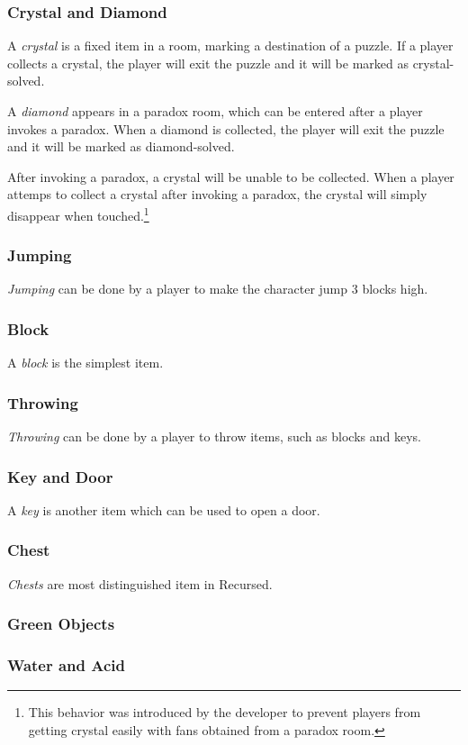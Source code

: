 \documentclass[a4paper]{article}
\theoremstyle{definition}
\begin{document}
\subsubsection{Crystal and Diamond}
A \emph{crystal} is a fixed item in a room, marking a destination of a puzzle. If a player
collects a crystal, the player will exit the puzzle and it will be marked as crystal-solved.

A \emph{diamond} appears in a paradox room, which can be entered after a player invokes a paradox.
When a diamond is collected, the player will exit the puzzle and it will be marked as diamond-solved.

After invoking a paradox, a crystal will be unable to be collected. When a player attemps to collect a crystal
after invoking a paradox, the crystal will simply disappear when touched.\footnote{This behavior was introduced
by the developer to prevent players from getting crystal easily with fans obtained from a paradox room.}
\subsubsection{Jumping}
\emph{Jumping} can be done by a player to make the character jump 3 blocks high.
\subsubsection{Block}
A \emph{block} is the simplest item.
\subsubsection{Throwing}
\emph{Throwing} can be done by a player to throw items, such as blocks and keys.
\subsubsection{Key and Door}
A \emph{key} is another item which can be used to open a door.
\subsubsection{Chest}
\emph{Chests} are most distinguished item in Recursed.
\subsubsection{Green Objects}
\subsubsection{Water and Acid}
\end{document}
